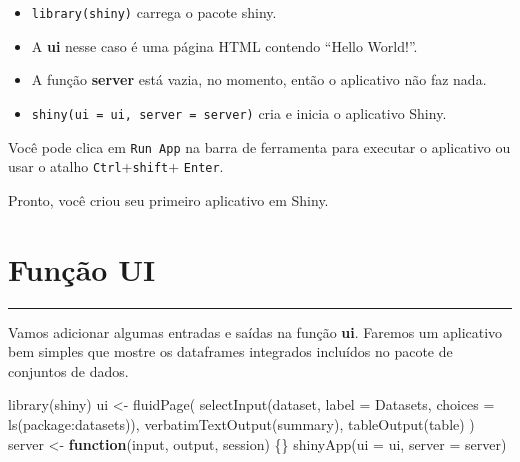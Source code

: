 \documentclass[
]{book}
\newenvironment{Shaded}{\begin{snugshade}}{\end{snugshade}}
\newcommand{\AttributeTok}[1]{\textcolor[rgb]{0.77,0.63,0.00}{#1}}
\newcommand{\ControlFlowTok}[1]{\textcolor[rgb]{0.13,0.29,0.53}{\textbf{#1}}}
\newcommand{\FunctionTok}[1]{\textcolor[rgb]{0.00,0.00,0.00}{#1}}
\newcommand{\NormalTok}[1]{#1}
\newcommand{\OtherTok}[1]{\textcolor[rgb]{0.56,0.35,0.01}{#1}}
\newcommand{\StringTok}[1]{\textcolor[rgb]{0.31,0.60,0.02}{#1}}
\begin{document}
\begin{itemize}
\item
  \texttt{library(shiny)} carrega o pacote shiny.
\item
  A \textbf{ui} nesse caso é uma página HTML contendo ``Hello World!''.
\item
  A função \textbf{server} está vazia, no momento, então o aplicativo não faz nada.
\item
  \texttt{shiny(ui\ =\ ui,\ server\ =\ server)} cria e inicia o aplicativo Shiny.
\end{itemize}

Você pode clica em \texttt{Run\ App} na barra de ferramenta para executar o aplicativo ou usar o atalho \texttt{Ctrl}+\texttt{shift}+ \texttt{Enter}.

Pronto, você criou seu primeiro aplicativo em Shiny.

\hypertarget{funuxe7uxe3o-ui}{%
\chapter{\texorpdfstring{\textbf{Função UI}}{Função UI}}\label{funuxe7uxe3o-ui}}

\begin{center}\rule{0.5\linewidth}{0.5pt}\end{center}

Vamos adicionar algumas entradas e saídas na função \textbf{ui}. Faremos um aplicativo bem simples que mostre os dataframes integrados incluídos no pacote de conjuntos de dados.

\begin{Shaded}
\begin{Highlighting}[]
\FunctionTok{library}\NormalTok{(shiny)}
\NormalTok{ui }\OtherTok{\textless{}{-}} \FunctionTok{fluidPage}\NormalTok{(}
  \FunctionTok{selectInput}\NormalTok{(}\StringTok{\textquotesingle{}dataset\textquotesingle{}}\NormalTok{, }\AttributeTok{label =} \StringTok{\textquotesingle{}Datasets\textquotesingle{}}\NormalTok{, }\AttributeTok{choices =} \FunctionTok{ls}\NormalTok{(}\StringTok{\textquotesingle{}package:datasets\textquotesingle{}}\NormalTok{)),}
  \FunctionTok{verbatimTextOutput}\NormalTok{(}\StringTok{\textquotesingle{}summary\textquotesingle{}}\NormalTok{),}
  \FunctionTok{tableOutput}\NormalTok{(}\StringTok{\textquotesingle{}table\textquotesingle{}}\NormalTok{)}
\NormalTok{)}
\NormalTok{server }\OtherTok{\textless{}{-}} \ControlFlowTok{function}\NormalTok{(input, output, session) \{\}}
\FunctionTok{shinyApp}\NormalTok{(}\AttributeTok{ui =}\NormalTok{ ui, }\AttributeTok{server =}\NormalTok{ server)}
\end{Highlighting}
\end{Shaded}
\end{document}
